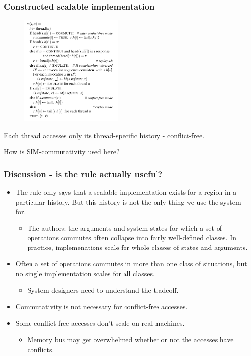 \documentclass{beamer}
\begin{document}
\begin{frame}
\frametitle{Constructed scalable implementation}
\begin{multicols}{2}
\begin{figure}
   \includegraphics[width=0.45\textwidth]{799-s14-docs/scalable_imple.png}
 \end{figure}
\columnbreak
Each thread accesses only its thread-specific history - conflict-free.
\end{multicols}

How is SIM-commutativity used here?

\end{frame}

\begin{frame}
\frametitle{Discussion - is the rule actually useful?}
\begin{itemize}

\item The rule only says that a scalable implementation exists for a region in a
 particular history. But this history is not the only thing we use the system for.

\begin{itemize}
\item The authors: the arguments and system states for which a set of operations
 commutes often collapse into fairly well-defined classes. In practice, implemenations 
scale for whole classes of states and arguments.
\end{itemize}

\item Often a set of operations commutes in more than one class of situations, but no 
single implementation scales for all classes.

\begin{itemize}  
\item System designers need to understand the tradeoff.
\end{itemize}

\item Commutativity is not necessary for conflict-free accesses.
\item Some conflict-free accesses don't scale on real machines.

\begin{itemize}
\item Memory bus may get overwhelmed whether or not the accesses have conflicts.
\end{itemize}

\end{itemize}

\end{frame}
\end{document}

